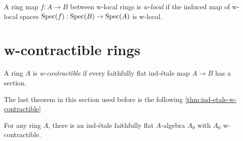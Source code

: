 \begin{definition}
    A ring map \(f: A \to B\) between w-local rings is \emph{w-local} if the induced map of w-local spaces \(\operatorname{Spec}(f) : \operatorname{Spec}(B) \to \operatorname{Spec}(A)\) is w-local.
    \label{def:w-local-ring-map}
\end{definition}

\section{w-contractible rings}

\begin{definition}
A ring \(A\) is \emph{w-contractible} if every faithfully flat ind-\'etale map \(A \to B\) has a section.
    \label{def:w-contractible-ring}
\end{definition}

The last theorem in this section used before \cite[Theorem 5.6.2]{proetale} is the following \cref{thm:ind-etale-w-contractible}

\begin{lemma}
For any ring $A$, there is an ind-\'etale faithfully flat $A$-algebra $A_0$ with $A_0$ w-contractible.
    \label{thm:ind-etale-w-contractible-cover-exists}
\end{lemma}

